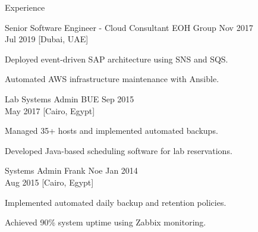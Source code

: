 \begin{rSection}{Experience}
    \begin{rSubsection}
        {Senior Software Engineer - Cloud Consultant}
        {EOH Group}
        {Nov 2017 \\ Jul 2019}
        [Dubai, UAE]
        \begin{rItemize}
            \item Deployed event-driven SAP architecture using SNS and SQS.
            \item Automated AWS infrastructure maintenance with Ansible.
        \end{rItemize}
    \end{rSubsection}

    \begin{rSubsection}
        {Lab Systems Admin}
        {BUE}
        {Sep 2015 \\ May 2017}
        [Cairo, Egypt]
        \begin{rItemize}
            \item Managed 35+ hosts and implemented automated backups.
            \item Developed Java-based scheduling software for lab reservations.
        \end{rItemize}
    \end{rSubsection}

    \begin{rSubsection}
        {Systems Admin}
        {Frank Noe}
        {Jan 2014 \\ Aug 2015}
        [Cairo, Egypt]
        \begin{rItemize}
            \item Implemented automated daily backup and retention policies.
            \item Achieved 90\% system uptime using Zabbix monitoring.
        \end{rItemize}
    \end{rSubsection}
\end{rSection}